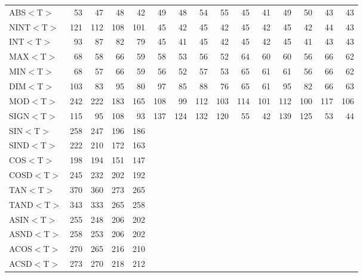 \begin{table}[h]
\begin{center}
{\begin{tabular}{|l|r|r||r|r||r|r||r|r||r|r||r|r||r|r|}
ABS$<$T$>$ &   53 &   47 &   48 &   42 &   49 &   48 &   54 &   55 &   45 &   41 &   49 &   50 &   43 &   43 \\
NINT$<$T$>$ &  121 &  112 &  108 &  101 &   45 &   42 &   45 &   42 &   45 &   42 &   45 &   42 &   44 &   43 \\
INT$<$T$>$ &   93 &   87 &   82 &   79 &   45 &   41 &   45 &   42 &   45 &   42 &   45 &   41 &   43 &   43 \\
MAX$<$T$>$ &   68 &   58 &   66 &   59 &   58 &   53 &   56 &   52 &   64 &   60 &   60 &   56 &   66 &   62 \\
MIN$<$T$>$ &   68 &   57 &   66 &   59 &   56 &   52 &   57 &   53 &   65 &   61 &   61 &   56 &   66 &   62 \\
DIM$<$T$>$ &  103 &   83 &   95 &   80 &   97 &   85 &   88 &   76 &   65 &   61 &   95 &   82 &   66 &   63 \\
MOD$<$T$>$ &  242 &  222 &  183 &  165 &  108 &   99 &  112 &  103 &  114 &  101 &  112 &  100 &  117 &  106 \\
SIGN$<$T$>$ &  115 &   95 &  108 &   93 &  137 &  124 &  132 &  120 &   55 &   42 &  139 &  125 &   53 &   44 \\
SIN$<$T$>$ &  258 &  247 &  196 &  186 &      &      &      &      &      &      &      &      &      &      \\
SIND$<$T$>$ &  222 &  210 &  172 &  163 &      &      &      &      &      &      &      &      &      &      \\
COS$<$T$>$ &  198 &  194 &  151 &  147 &      &      &      &      &      &      &      &      &      &      \\
COSD$<$T$>$ &  245 &  232 &  202 &  192 &      &      &      &      &      &      &      &      &      &      \\
TAN$<$T$>$ &  370 &  360 &  273 &  265 &      &      &      &      &      &      &      &      &      &      \\
TAND$<$T$>$ &  343 &  333 &  265 &  258 &      &      &      &      &      &      &      &      &      &      \\
ASIN$<$T$>$ &  255 &  248 &  206 &  202 &      &      &      &      &      &      &      &      &      &      \\
ASND$<$T$>$ &  258 &  253 &  206 &  202 &      &      &      &      &      &      &      &      &      &      \\
ACOS$<$T$>$ &  270 &  265 &  216 &  210 &      &      &      &      &      &      &      &      &      &      \\
ACSD$<$T$>$ &  273 &  270 &  218 &  212 &      &      &      &      &      &      &      &      &      &      \\

\end{tabular}}
\end{center}
\end{table}
